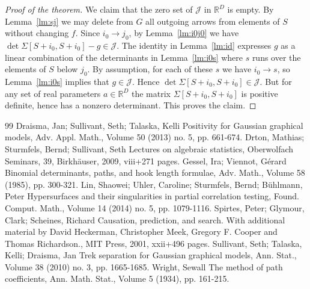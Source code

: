 \documentclass[10pt]{amsart}
\theoremstyle{definition}
\newcommand{\RR}{\mathbb{R}}
\newcommand{\cJ}{\mathcal{J}}
\begin{document}
\begin{proof}[Proof of the theorem]
We claim that the zero set of $\cJ$ in $\RR^D$ is empty. By Lemma~\ref{lm:sj} we may delete from $G$ all outgoing arrows from elements of $S$ without changing $f$. Since $i_0 \to j_0$, by Lemma~\ref{lm:i0j0} we have $\det \Sigma[S+i_0,S+i_0]-g \in \cJ$. The identity in Lemma~\ref{lm:id} expresses $g$ as a linear combination of the determinants in Lemma~\ref{lm:i0s} where $s$ runs over the elements of $S$ below $j_0$. By assumption, for each of these $s$ we have $i_0 \to s$, so Lemma~\ref{lm:i0s} implies that $g \in \cJ$. Hence $\det \Sigma[S+i_0,S+i_0]
\in \cJ$. But for any set of real parameters $a \in \RR^D$ the matrix $\Sigma[S+i_0,S+i_0]$ is positive definite, hence has a nonzero determinant. This proves the claim.
\end{proof}
\begin{thebibliography}{99}
 Draisma, Jan; Sullivant, Seth; Talaska, Kelli Positivity for Gaussian graphical models, Adv. Appl. Math., Volume 50 (2013) no. 5, pp. 661-674.
 Drton, Mathias; Sturmfels, Bernd; Sullivant, Seth Lectures on algebraic statistics, Oberwolfach Seminars, 39, Birkhäuser, 2009, viii+271 pages.
 Gessel, Ira; Viennot, Gérard Binomial determinants, paths, and hook length formulae, Adv. Math., Volume 58 (1985), pp. 300-321.
 Lin, Shaowei; Uhler, Caroline; Sturmfels, Bernd; Bühlmann, Peter Hypersurfaces and their singularities in partial correlation testing, Found. Comput. Math., Volume 14 (2014) no. 5, pp. 1079-1116.
 Spirtes, Peter; Glymour, Clark; Scheines, Richard Causation, prediction, and search. With additional material by David Heckerman, Christopher Meek, Gregory F. Cooper and Thomas Richardson., MIT Press, 2001, xxii+496 pages.
 Sullivant, Seth; Talaska, Kelli; Draisma, Jan Trek separation for Gaussian graphical models, Ann. Stat., Volume 38 (2010) no. 3, pp. 1665-1685.
 Wright, Sewall The method of path coefficients, Ann. Math. Stat., Volume 5 (1934), pp. 161-215.
\end{thebibliography}
\end{document}
